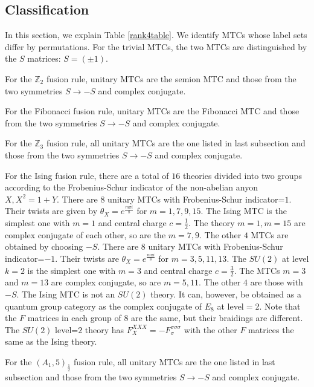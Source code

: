 \documentclass[12pt,psamsfonts]{amsart}
\DeclareMathOperator{\U}{U}
\newcommand{\Z}{\mathbb Z}
\numberwithin{equation}{section}
\theoremstyle{definition}
\begin{document}
\subsection{Classification}\label{count}

In this section, we explain Table \ref{rank4table}.  We identify
MTCs whose label sets differ by permutations.  For the trivial
MTCs, the two MTCs are distinguished by the $S$ matrices: $S=(\pm
1)$.

For the $\Z_2$ fusion rule, unitary MTCs are the semion MTC and
those from the two symmetries $S\rightarrow -S$ and complex
conjugate.

For the Fibonacci fusion rule, unitary MTCs are the Fibonacci MTC
and those from the two symmetries $S\rightarrow -S$ and complex
conjugate.

For the $\Z_3$ fusion rule, all unitary MTCs are the one listed in
last subsection and those from the two symmetries $S\rightarrow
-S$ and complex conjugate.

For the Ising fusion rule, there are a total of $16$ theories
divided into two groups according to the Frobenius-Schur indicator
of the non-abelian anyon $X,X^2=1+Y$.  There are $8$ unitary MTCs
with Frobenius-Schur indicator=$1$.  Their twists are given by
$\theta_X=e^{\frac{m\pi i}{8}}$ for $m=1,7,9,15$.  The Ising MTC
is the simplest one with $m=1$ and central charge $c=\frac{1}{2}$.
The theory $m=1,m=15$ are complex conjugate of each other, so are
the $m=7,9$.  The other $4$ MTCs are obtained by choosing $-S$.
There are $8$ unitary MTCs with Frobenius-Schur indicator=$-1$.
Their twists are $\theta_X=e^{\frac{m\pi i}{8}}$ for
$m=3,5,11,13$.  The $SU(2)$ at level $k=2$ is the simplest one
with $m=3$ and central charge $c=\frac{3}{2}$.  The MTCs $m=3$ and
$m=13$ are complex conjugate, so are $m=5,11$.  The other $4$ are
those with $-S$. The Ising MTC is not an $SU(2)$ theory.  It can,
however, be obtained as a quantum group category as the complex
conjugate of $E_8$ at level$=$2. Note that
the $F$ matrices in each group of $8$ are the same, but their
braidings are different.  The $SU(2)$ level=$2$ theory has
$F_{X}^{XXX}=-F_{\sigma}^{\sigma\sigma\sigma}$ with the other $F$
matrices the same as the Ising theory.

For the $(A_1,5)_{\frac{1}{2}}$ fusion rule, all unitary MTCs are
the one listed in last subsection and those from the two
symmetries $S\rightarrow -S$ and complex conjugate.
\end{document}
